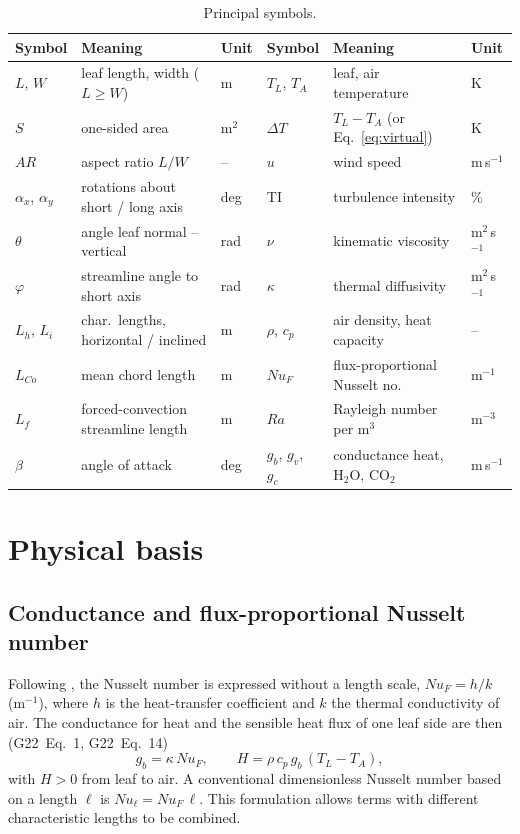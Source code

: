 \documentclass[11pt,a4paper]{article}
\newcommand{\Nu}{\mathit{Nu}}
\newcommand{\NuF}{\mathit{Nu}_F}
\newcommand{\Ra}{\mathit{Ra}}
\newcommand{\Gtt}[1]{G22~Eq.~#1}
\begin{document}
\begin{table}[ht]
\centering\small
\caption{Principal symbols.}\label{tab:symbols}
\footnotesize
\begin{tabular}{lll@{\hspace{1.5em}}lll}
\toprule
Symbol & Meaning & Unit & Symbol & Meaning & Unit\\
\midrule
$L$, $W$ & leaf length, width ($L\ge W$) & m & $T_L$, $T_A$ & leaf, air temperature & K\\
$S$ & one-sided area & m$^2$ & $\Delta T$ & $T_L-T_A$ (or Eq.~\ref{eq:virtual}) & K\\
$AR$ & aspect ratio $L/W$ & -- & $u$ & wind speed & m\,s$^{-1}$\\
$\alpha_x$, $\alpha_y$ & rotations about short / long axis & deg & TI & turbulence intensity & \%\\
$\theta$ & angle leaf normal -- vertical & rad & $\nu$ & kinematic viscosity & m$^2$\,s$^{-1}$\\
$\varphi$ & streamline angle to short axis & rad & $\kappa$ & thermal diffusivity & m$^2$\,s$^{-1}$\\
$L_h$, $L_i$ & char.\ lengths, horizontal / inclined & m & $\rho$, $c_p$ & air density, heat capacity & --\\
$L_{Co}$ & mean chord length & m & $\NuF$ & flux-proportional Nusselt no. & m$^{-1}$\\
$L_f$ & forced-convection streamline length & m & $\Ra$ & Rayleigh number per m$^3$ & m$^{-3}$\\
$\beta$ & angle of attack & deg & $g_b$, $g_v$, $g_c$ & conductance heat, H$_2$O, CO$_2$ & m\,s$^{-1}$\\
\bottomrule
\end{tabular}
\end{table}

\section{Physical basis}\label{sec:basis}
\subsection{Conductance and flux-proportional Nusselt number}
Following \citet{graefe2022}, the Nusselt number is expressed without a length scale, $\NuF = h/k$ (m$^{-1}$), where $h$ is the heat-transfer coefficient and $k$ the thermal conductivity of air. The conductance for heat and the sensible heat flux of one leaf side are then (\Gtt{1}, \Gtt{14})
\begin{equation}
g_b = \kappa\,\NuF, \qquad H = \rho\,c_p\,g_b\,(T_L - T_A),\label{eq:gb}
\end{equation}
with $H>0$ from leaf to air. A conventional dimensionless Nusselt number based on a length $\ell$ is $\Nu_\ell = \NuF\,\ell$. This formulation allows terms with different characteristic lengths to be combined.
\end{document}
